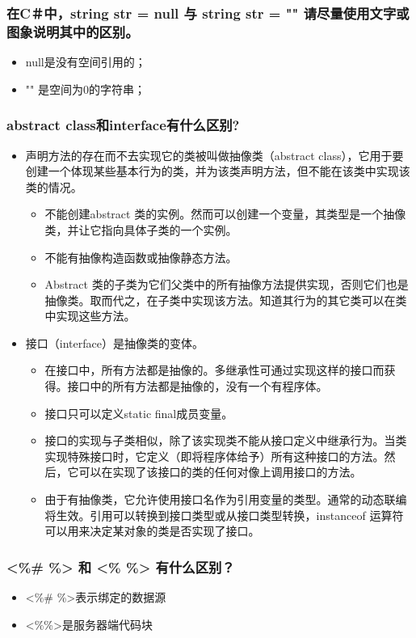 \documentclass[9pt, b5paper]{article}
\begin{document}
\subsubsection{在C＃中，string str = null 与 string str = "" 请尽量使用文字或图象说明其中的区别。}
\label{sec-1-1-98}
\begin{itemize}
\item null是没有空间引用的；
\item "" 是空间为0的字符串；
\end{itemize}
\subsubsection{abstract class和interface有什么区别?}
\label{sec-1-1-99}
\begin{itemize}
\item 声明方法的存在而不去实现它的类被叫做抽像类（abstract class），它用于要创建一个体现某些基本行为的类，并为该类声明方法，但不能在该类中实现该类的情况。
\begin{itemize}
\item 不能创建abstract 类的实例。然而可以创建一个变量，其类型是一个抽像类，并让它指向具体子类的一个实例。
\item 不能有抽像构造函数或抽像静态方法。
\item Abstract 类的子类为它们父类中的所有抽像方法提供实现，否则它们也是抽像类。取而代之，在子类中实现该方法。知道其行为的其它类可以在类中实现这些方法。
\end{itemize}
\item 接口（interface）是抽像类的变体。
\begin{itemize}
\item 在接口中，所有方法都是抽像的。多继承性可通过实现这样的接口而获得。接口中的所有方法都是抽像的，没有一个有程序体。
\item 接口只可以定义static final成员变量。
\item 接口的实现与子类相似，除了该实现类不能从接口定义中继承行为。当类实现特殊接口时，它定义（即将程序体给予）所有这种接口的方法。然后，它可以在实现了该接口的类的任何对像上调用接口的方法。
\item 由于有抽像类，它允许使用接口名作为引用变量的类型。通常的动态联编将生效。引用可以转换到接口类型或从接口类型转换，instanceof 运算符可以用来决定某对象的类是否实现了接口。
\end{itemize}
\end{itemize}
\subsubsection{<\%\# \%> 和 <\% \%> 有什么区别？}
\label{sec-1-1-100}
\begin{itemize}
\item <\%\# \%>表示绑定的数据源
\item <\%\%>是服务器端代码块
\end{itemize}
\end{document}
